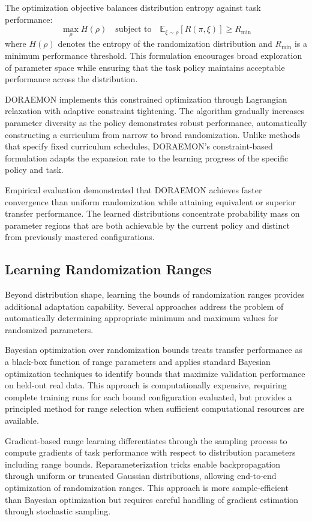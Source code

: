 The optimization objective balances distribution entropy against task performance:
\begin{equation}
\max_\rho H(\rho) \quad \text{subject to} \quad \mathbb{E}_{\xi \sim \rho}[R(\pi, \xi)] \geq R_{\min}
\end{equation}
where $H(\rho)$ denotes the entropy of the randomization distribution and $R_{\min}$ is a minimum performance threshold. This formulation encourages broad exploration of parameter space while ensuring that the task policy maintains acceptable performance across the distribution.

DORAEMON implements this constrained optimization through Lagrangian relaxation with adaptive constraint tightening. The algorithm gradually increases parameter diversity as the policy demonstrates robust performance, automatically constructing a curriculum from narrow to broad randomization. Unlike methods that specify fixed curriculum schedules, DORAEMON's constraint-based formulation adapts the expansion rate to the learning progress of the specific policy and task.

Empirical evaluation demonstrated that DORAEMON achieves faster convergence than uniform randomization while attaining equivalent or superior transfer performance. The learned distributions concentrate probability mass on parameter regions that are both achievable by the current policy and distinct from previously mastered configurations.

\subsection{Learning Randomization Ranges}

Beyond distribution shape, learning the bounds of randomization ranges provides additional adaptation capability. Several approaches address the problem of automatically determining appropriate minimum and maximum values for randomized parameters.

Bayesian optimization over randomization bounds treats transfer performance as a black-box function of range parameters and applies standard Bayesian optimization techniques to identify bounds that maximize validation performance on held-out real data. This approach is computationally expensive, requiring complete training runs for each bound configuration evaluated, but provides a principled method for range selection when sufficient computational resources are available.

Gradient-based range learning differentiates through the sampling process to compute gradients of task performance with respect to distribution parameters including range bounds. Reparameterization tricks enable backpropagation through uniform or truncated Gaussian distributions, allowing end-to-end optimization of randomization ranges. This approach is more sample-efficient than Bayesian optimization but requires careful handling of gradient estimation through stochastic sampling.


